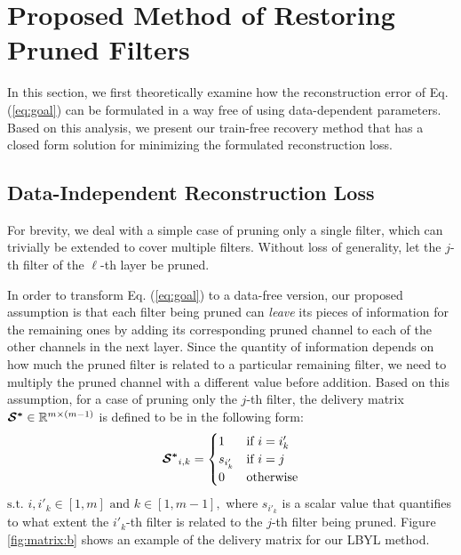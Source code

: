 \section{Proposed Method of Restoring Pruned Filters} \label{sec:method}
In this section, we first theoretically examine how the reconstruction error of Eq. (\ref{eq:goal}) can be formulated in a way free of using data-dependent parameters. Based on this analysis, we present our train-free recovery method that has a closed form solution for minimizing the formulated reconstruction loss.


\subsection{Data-Independent Reconstruction Loss} \label{sec:method:a}
For brevity, we deal with a simple case of pruning only a single filter, which can trivially be extended to cover multiple filters. Without loss of generality, let the $j$-th filter of the $\ell$-th layer be pruned. 

In order to transform Eq. (\ref{eq:goal}) to a data-free version, our proposed assumption is that each filter being pruned can \textit{leave} its pieces of information for the remaining ones by adding its corresponding pruned channel to each of the other channels in the next layer. Since the quantity of information depends on how much the pruned filter is related to a particular remaining filter, we need to multiply the pruned channel with a different value before addition. Based on this assumption, for a case of pruning only the $j$-th filter, the delivery matrix $\boldsymbol{\S^*} \in \mathbb{R}^{m \times (m-1)}$ is defined to be in the following form:
\begin{eqnarray}\begin{split}\label{eq:matrix}
\boldsymbol{\S^*}_{i,k} = 
  \begin{cases} 
   1 & \text{if } i = i'_k \\
   s_{i'_k} & \text{if } i = j \\
   0 & \text{otherwise}
  \end{cases}
  \end{split}
\end{eqnarray}
 $\text{s.t. } i, i'_k \in [1, m] \text{ and } k \in [1, m-1],$ where $s_{i'_k}$ is a scalar value that quantifies to what extent the $i'_k$-th filter is related to the $j$-th filter being pruned. Figure \ref{fig:matrix:b} shows an example of the delivery matrix for our LBYL method.


